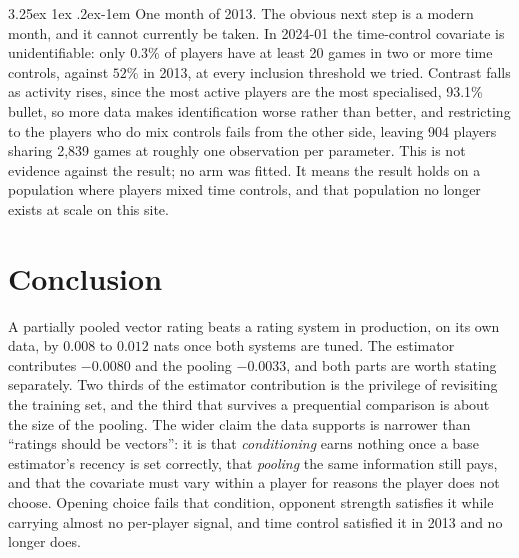 \documentclass[11pt]{article}
\makeatletter
\renewcommand\paragraph{\@startsection{paragraph}{4}{\z@}%
  {3.25ex \@plus1ex \@minus.2ex}{-1em}%
  {\normalfont\normalsize\itshape}}
\makeatother
\begin{document}
\paragraph{One month of 2013.}
The obvious next step is a modern month, and it cannot currently be
taken. In 2024-01 the time-control covariate is unidentifiable: only
$0.3\%$ of players have at least 20 games in two or more time controls,
against $52\%$ in 2013, at every inclusion threshold we tried. Contrast
falls as activity rises, since the most active players are the most
specialised, 93.1\% bullet, so more data makes identification worse
rather than better, and restricting to the players who do mix controls
fails from the other side, leaving 904 players sharing 2{,}839 games
at roughly one observation per parameter. This is not evidence against
the result; no arm was fitted. It means the result holds on a
population where players mixed time controls, and that population no
longer exists at scale on this site.

\section{Conclusion}

A partially pooled vector rating beats a rating system in production,
on its own data, by $0.008$ to $0.012$ nats once both systems are
tuned. The estimator contributes $-0.0080$ and the pooling $-0.0033$,
and both parts are worth stating separately. Two thirds of the
estimator contribution is the privilege of revisiting the training set,
and the third that survives a prequential comparison is about the size
of the pooling. The wider claim the data
supports is narrower than ``ratings should be vectors'': it is that
\emph{conditioning} earns nothing once a base estimator's recency is
set correctly, that \emph{pooling} the same information still pays,
and that the covariate must vary within a player for reasons the player
does not choose. Opening choice fails that
condition, opponent strength satisfies it while carrying almost no
per-player signal, and time control satisfied it in 2013 and no longer
does.
\end{document}
